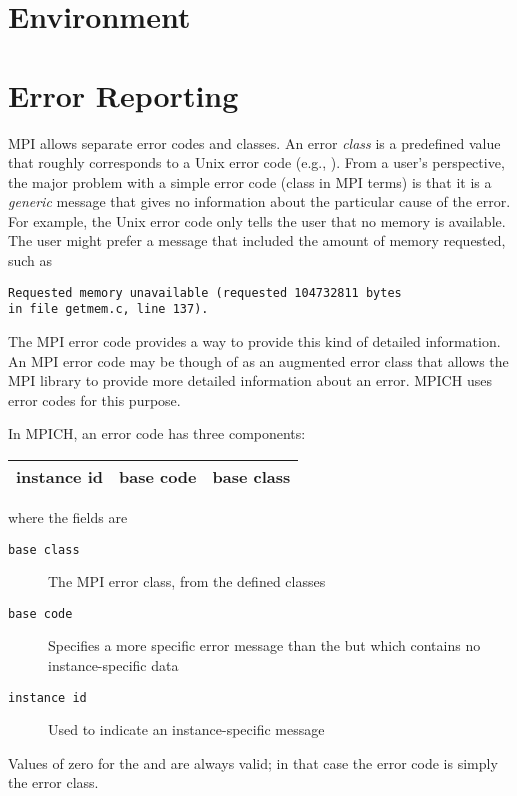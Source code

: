 \documentclass{article}
\begin{document}
\section{Environment}


\section{Error Reporting}
MPI allows separate error codes and classes.  An error \emph{class} is
a predefined value that roughly corresponds to a Unix error code
(e.g., ).  From a user's perspective, the major problem
with a simple error code (class in MPI terms) is that it is a
\emph{generic} message that gives no information about the particular
cause of the error.  For example, the Unix error code 
only tells the user that no memory is available.  The user might
prefer a message that included the amount of memory requested, such as 
\begin{verbatim}
Requested memory unavailable (requested 104732811 bytes 
in file getmem.c, line 137).
\end{verbatim}
The MPI error code provides a way to provide this kind of detailed
information.  An MPI error code may be though of as an
augmented error class that allows the MPI library to provide more
detailed information about an error.  MPICH uses error codes for this
purpose.  

In MPICH, an error code has three components:

\begin{center}
\begin{tabular}{|c|c|c|}
\hline
instance id&base code&base class\\
\hline
\end{tabular}
\end{center}
where the fields are
\begin{description}
\item[\texttt{base class}]The MPI error class, from the defined classes
\item[\texttt{base code}]Specifies a more specific error message than
the  but which contains no instance-specific data
\item[\texttt{instance id}]Used to indicate an instance-specific message
\end{description}

Values of zero for the  and  are
always valid; in that case the error code is simply the error class.
\end{document}
